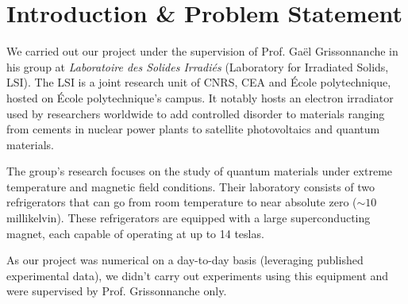 \section{Introduction \& Problem Statement}

We carried out our project under the supervision of Prof. Gaël Grissonnanche in his group at \textit{Laboratoire des Solides Irradiés} (Laboratory for Irradiated Solids, LSI). 
The LSI is a joint research unit of CNRS, CEA and École polytechnique, hosted on École polytechnique's campus.
It notably hosts an electron irradiator used by researchers worldwide to add controlled disorder to materials ranging from cements in nuclear power plants to satellite photovoltaics and quantum materials.

The group's research focuses on the study of quantum materials under extreme temperature and magnetic field conditions. 
Their laboratory consists of two refrigerators that can go from room temperature to near absolute zero ($\sim 10$ millikelvin).
These refrigerators are equipped with a large superconducting magnet, 
each capable of operating at up to 14 teslas.

As our project was numerical on a day-to-day basis (leveraging published experimental data), 
we didn't carry out experiments using this equipment and were supervised by Prof. Grissonnanche only. 

